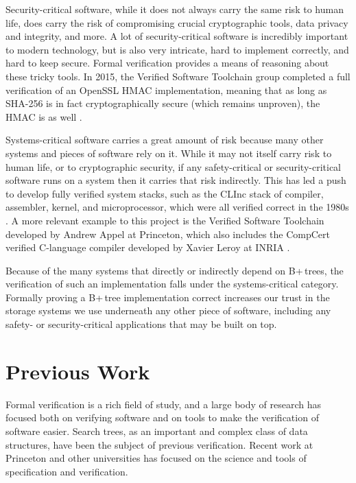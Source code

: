 \documentclass[12pt]{article}
\begin{document}
Security-critical software, while it does not always carry the same risk to human life, does carry the risk of compromising crucial cryptographic tools, data privacy and integrity, and more. A lot of security-critical software is incredibly important to modern technology, but is also very intricate, hard to implement correctly, and hard to keep secure. Formal verification provides a means of reasoning about these tricky tools. In 2015, the Verified Software Toolchain group completed a full verification of an OpenSSL HMAC implementation, meaning that as long as SHA-256 is in fact cryptographically secure (which remains unproven), the HMAC is as well \cite{190894}.

Systems-critical software carries a great amount of risk because many other systems and pieces of software rely on it. While it may not itself carry risk to human life, or to cryptographic security, if any safety-critical or security-critical software runs on a system then it carries that risk indirectly. This has led a push to develop fully verified system stacks, such as the CLInc stack of compiler, assembler, kernel, and microprocessor, which were all verified correct in the 1980s \cite{225554}. A more relevant example to this project is the Verified Software Toolchain developed by Andrew Appel at Princeton, which also includes the CompCert verified C-language compiler developed by Xavier Leroy at INRIA \cite{Leroy:2009:FVR:1538788.1538814}.

Because of the many systems that directly or indirectly depend on B+\,trees, the verification of such an implementation falls under the systems-critical category. Formally proving a B+\,tree implementation correct increases our trust in the storage systems we use underneath any other piece of software, including any safety- or security-critical applications that may be built on top.

\clearpage

\section{Previous Work}

Formal verification is a rich field of study, and a large body of research has focused both on verifying software and on tools to make the verification of software easier. Search trees, as an important and complex class of data structures, have been the subject of previous verification. Recent work at Princeton and other universities has focused on the science and tools of specification and verification.
\end{document}
